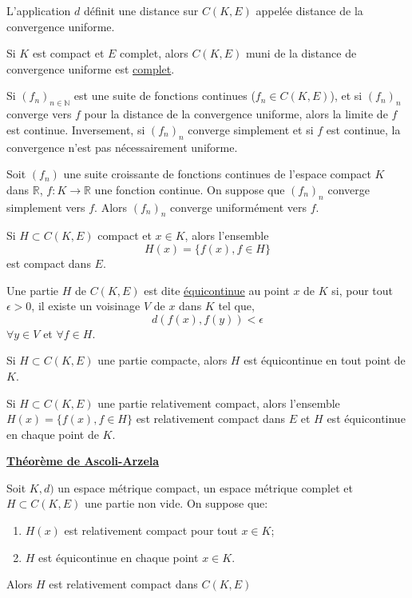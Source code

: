 \documentclass[12pt,a4paper]{article}
\begin{document}
\begin{flushleft}
\begin{thm}
L'application $d$ définit une distance sur $C(K,E)$ appelée distance de la convergence uniforme.
 \end{thm}


\begin{thm}
Si $K$ est compact et $E$ complet, alors $C(K,E)$ muni de la distance de convergence uniforme est \underline{complet}.
 \end{thm}


\begin{rem}
Si $(f_n)_{n \in \mathbb{N}}$ est une suite de fonctions continues ($f_n \in C(K,E)$), et si $(f_n)_n$ converge vers $f$ pour la distance de la convergence uniforme, alors la limite de $f$ est continue. Inversement, si $(f_n)_n$ converge simplement et si $f$ est continue, la convergence n'est pas nécessairement uniforme.
 \end{rem}


\begin{thm}
Soit $(f_n)$ une suite croissante de fonctions continues de l'espace compact $K$ dans $\mathbb{R}$, $f: K \longrightarrow \mathbb{R}$ une fonction continue. On suppose que $(f_n)_n$ converge simplement vers $f$. Alors $(f_n)_n$ converge uniformément vers $f$.
 \end{thm}


\begin{thm}
Si $H \subset C(K,E)$ compact et $x \in K$, alors l'ensemble $$H(x) = \{ f(x), f \in H \}$$ est compact dans $E$.
 \end{thm}


\begin{mydef}
Une partie $H$ de $C(K,E)$ est dite \underline{équicontinue} au point $x$ de $K$ si, pour tout $ \epsilon > 0$, il existe un voisinage $V$ de $x$ dans $K$ tel que, $$d(f(x),f(y)) < \epsilon$$ $\forall y \in V$ et $\forall f \in H$. 
 \end{mydef}


\begin{thm}
Si $H \subset C(K,E)$ une partie compacte, alors $H$ est équicontinue en tout point de $K$.
 \end{thm}


\begin{thm}
Si $H \subset C(K,E)$ une partie relativement compact, alors l'ensemble $H(x) = \{ f(x), f \in H \}$ est relativement compact dans $E$ et $H$ est équicontinue en chaque point de $K$.
\end{thm}

\underline{\textbf{Théorème de Ascoli-Arzela}}
\begin{thm}
Soit $K,d)$ un espace métrique compact, \edm un espace métrique complet et $H \subset C(K,E)$ une partie non vide. On suppose que:
\begin{enumerate}
\item $H(x)$ est relativement compact pour tout $x \in K$;
\item $H$ est équicontinue en chaque point $x \in K$.
\end{enumerate}
Alors $H$ est relativement compact dans $C(K,E)$
\end{thm}



\end{flushleft}
\end{document}
